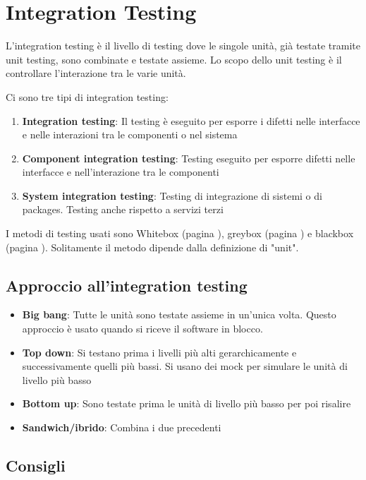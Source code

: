 \documentclass[11pt,a4paper]{book}
\begin{document}
\section{Integration Testing}\label{par: integration test}
L'integration testing è il livello di testing dove le singole unità, già testate tramite unit testing, sono combinate e testate assieme. Lo scopo dello unit testing è il controllare l'interazione tra le varie unità.

Ci sono tre tipi di integration testing:
\begin{enumerate}
	\item \textbf{Integration testing}: Il testing è eseguito per esporre i difetti nelle interfacce e nelle interazioni tra le componenti o nel sistema
	\item \textbf{Component integration testing}: Testing eseguito per esporre difetti nelle interfacce e nell'interazione tra le componenti
	\item \textbf{System integration testing}: Testing di integrazione di sistemi o di packages. Testing anche rispetto a servizi terzi
\end{enumerate}

I metodi di testing usati sono Whitebox (pagina \pageref{par: whitebox}), greybox (pagina \pageref{par: graybox}) e blackbox (pagina \pageref{par: blackbox}). Solitamente il metodo dipende dalla definizione di "unit".

\subsection{Approccio all'integration testing}
\begin{itemize}
	\item \textbf{Big bang}: Tutte le unità sono testate assieme in un'unica volta. Questo approccio è usato quando si riceve il software in blocco. 
	\item \textbf{Top down}: Si testano prima i livelli più alti gerarchicamente e successivamente quelli più bassi. Si usano dei mock per simulare le unità di livello più basso
	\item \textbf{Bottom up}: Sono testate prima le unità di livello più basso per poi risalire
	\item \textbf{Sandwich/ibrido}: Combina i due precedenti
\end{itemize}

\subsection{Consigli}
\end{document}
